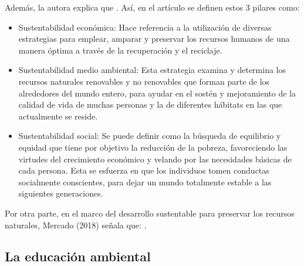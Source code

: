 Además, la autora explica que . Así, en el artículo se definen estos 3 pilares como:

\begin{itemize}
    \item Sustentabilidad económica: Hace referencia a la utilización de diversas estrategias para emplear, amparar y preservar los recursos humanos de una manera óptima a través de la recuperación y el reciclaje.
    
    \item Sustentabilidad medio ambiental: Esta estrategia examina y determina los recursos naturales renovables y no renovables que forman parte de los alrededores del mundo entero, para ayudar en el sostén y mejoramiento de la calidad de vida de muchas personas y la de diferentes hábitats en las que actualmente se reside.
    
    \item Sustentabilidad social: Se puede definir como la búsqueda de equilibrio y equidad que tiene por objetivo la reducción de la pobreza, favoreciendo las virtudes del crecimiento económico y velando por las necesidades básicas de cada persona. Esta se esfuerza en que los individuos tomen conductas socialmente conscientes, para dejar un mundo totalmente estable a las siguientes generaciones.
\end{itemize}

Por otra parte, en el marco del desarrollo sustentable para preservar los recursos naturales, Mercado (2018) señala que: . 

\subsection{La educación ambiental}

